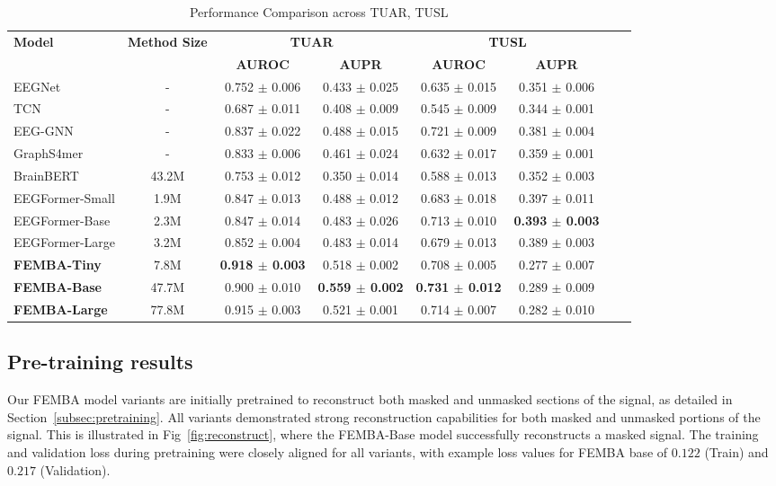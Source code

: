 \begin{table}[h!]
\centering
\caption{Performance Comparison across TUAR, TUSL}
\label{tab:results_tusl_neonate}
\resizebox{\columnwidth}{!} {
\setlength{\tabcolsep}{2pt} 
\begin{tabular}{@{}lccccccc@{}}
\toprule
\textbf{Model} & \textbf{Method Size} & \multicolumn{2}{c}{\textbf{TUAR}} & \multicolumn{2}{c}{\textbf{TUSL}} \\
\cmidrule(lr){3-4} \cmidrule(lr){5-6}
 &  & \textbf{AUROC} & \textbf{AUPR} & \textbf{AUROC} & \textbf{AUPR} \\
\midrule
EEGNet       & -  & 0.752 $\pm$ 0.006 & 0.433 $\pm$ 0.025 & 0.635 $\pm$ 0.015 & 0.351 $\pm$ 0.006  \\
TCN          & - & 0.687 $\pm$ 0.011 & 0.408 $\pm$ 0.009 & 0.545 $\pm$ 0.009 & 0.344 $\pm$ 0.001  \\
EEG-GNN      & - & 0.837 $\pm$ 0.022 & 0.488 $\pm$ 0.015 & 0.721 $\pm$ 0.009 & 0.381 $\pm$ 0.004  \\
GraphS4mer   & -  & 0.833 $\pm$ 0.006 & 0.461 $\pm$ 0.024 & 0.632 $\pm$ 0.017 & 0.359 $\pm$ 0.001  \\
BrainBERT    & 43.2M  & 0.753 $\pm$ 0.012 & 0.350 $\pm$ 0.014 & 0.588 $\pm$ 0.013 & 0.352 $\pm$ 0.003  \\
EEGFormer-Small  & 1.9M  & 0.847 $\pm$ 0.013 & 0.488 $\pm$ 0.012 & 0.683 $\pm$ 0.018 & 0.397 $\pm$ 0.011  \\
EEGFormer-Base  & 2.3M & 0.847 $\pm$ 0.014 & 0.483 $\pm$ 0.026 & 0.713 $\pm$ 0.010 & \textbf{0.393 $\pm$ 0.003}  \\
EEGFormer-Large  & 3.2M & 0.852 $\pm$ 0.004 & 0.483 $\pm$ 0.014 & 0.679 $\pm$ 0.013 & 0.389 $\pm$ 0.003  \\
\midrule
\textbf{FEMBA-Tiny}  & 7.8M  & \textbf{0.918 $\pm$ 0.003} & 0.518 $\pm$ 0.002 & 0.708 $\pm$ 0.005 & 0.277 $\pm$ 0.007 \\
\textbf{FEMBA-Base}  & 47.7M & 0.900 $\pm$ 0.010 & \textbf{0.559 $\pm$ 0.002}& \textbf{0.731 $\pm$ 0.012} & 0.289 $\pm$ 0.009\\
\textbf{FEMBA-Large} & 77.8M  & 0.915 $\pm$ 0.003 & 0.521 $\pm$ 0.001 &0.714 $\pm$ 0.007 & 0.282 $\pm$ 0.010 \\

\bottomrule
\end{tabular}
}
\end{table}
\subsection{Pre-training results}
Our FEMBA model variants are initially pretrained to reconstruct both masked and unmasked sections of the signal, as detailed in Section~\ref{subsec:pretraining}. All variants demonstrated strong reconstruction capabilities for both masked and unmasked portions of the signal. This is illustrated in Fig~\ref{fig:reconstruct}, where the FEMBA-Base model successfully reconstructs a masked signal. The training and validation loss during pretraining were closely aligned for all variants, with example loss values for FEMBA base of $0.122$ (Train) and $0.217$ (Validation).


